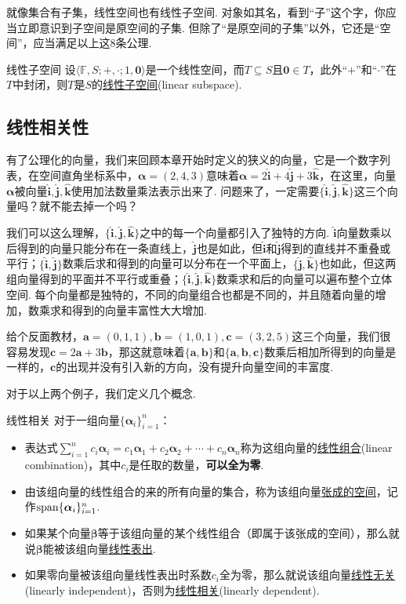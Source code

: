 \documentclass[main.tex]{subfiles}
\begin{document}
就像集合有子集，线性空间也有线性子空间. 对象如其名，看到“子”这个字，你应当立即意识到子空间是原空间的子集. 但除了“是原空间的子集”以外，它还是“空间”，应当满足以上这8条公理.

\begin{definition}{线性子空间}
    设\(\langle \mathbb{F}, S;+,\cdot;1,\bm 0\rangle\)是一个线性空间，而\(T \subseteq S\)且\(\bm 0 \in T\)，此外“\(+\)”和“\(\cdot\)”在\(T\)中封闭，则\(T\)是\(S\)的\uline{线性子空间}(linear subspace).
\end{definition}

\subsection{线性相关性}

有了公理化的向量，我们来回顾本章开始时定义的狭义的向量，它是一个数字列表，在空间直角坐标系中，\(\bm\alpha = (2,4,3)\)意味着\(\bm{\alpha} = 2\bm{\hat i} + 4\bm{\hat j} + 3\bm{\hat k}\)，在这里，向量\(\bm\alpha\)被向量\(\bm{\hat i}, \bm{\hat j}, \bm{\hat k}\)使用加法数量乘法表示出来了. 问题来了，一定需要\(\{\bm{\hat i}, \bm{\hat j}, \bm{\hat k}\}\)这三个向量吗？就不能去掉一个吗？

我们可以这么理解，\(\{\bm{\hat i}, \bm{\hat j}, \bm{\hat k}\}\)之中的每一个向量都引入了独特的方向. \(\bm{\hat i}\)向量数乘以后得到的向量只能分布在一条直线上，\(\bm{\hat j}\)也是如此，但\(\bm{\hat i}\)和\(\bm{\hat j}\)得到的直线并不重叠或平行；\(\{\bm{\hat i},\bm{\hat j}\}\)数乘后求和得到的向量可以分布在一个平面上，\(\{\bm{\hat j},\bm{\hat k}\}\)也如此，但这两组向量得到的平面并不平行或重叠；\(\{\bm{\hat i}, \bm{\hat j}, \bm{\hat k}\}\)数乘求和后的向量可以遍布整个立体空间. 每个向量都是独特的，不同的向量组合也都是不同的，并且随着向量的增加，数乘求和得到的向量丰富性大大增加.

给个反面教材，\(\bm{a} = (0,1,1), \bm{b} = (1,0,1), \bm{c} = (3,2,5)\)这三个向量，我们很容易发现\(\bm{c} = 2\bm a+3\bm b\)，那这就意味着\(\{\bm a,\bm b\}\)和\(\{\bm a,\bm b,\bm c\}\)数乘后相加所得到的向量是一样的，\(\bm c\)的出现并没有引入新的方向，没有提升向量空间的丰富度.

对于以上两个例子，我们定义几个概念.

\begin{definition}{线性相关}
    对于一组向量\(\{\bm\alpha_i\}_{i=1}^{n}\)：
    \begin{itemize}
        \item 表达式\(\displaystyle{\sum_{i=1}^{n}c_i\bm\alpha_i = c_1\bm\alpha_1+c_2\bm\alpha_2+\cdots+c_n\bm\alpha_n}\)称为这组向量的\uline{线性组合}(linear combination)，其中\(c_i\)是任取的数量，\textbf{可以全为零}.
        \item 由该组向量的线性组合的来的所有向量的集合，称为该组向量\uline{张成的空间}，记作\({\rm span}\{\bm\alpha_i\}_{i=1}^{n}\).
        \item 如果某个向量\(\bm\beta\)等于该组向量的某个线性组合（即属于该张成的空间），那么就说\(\bm\beta\)能被该组向量\uline{线性表出}.
        \item 如果零向量被该组向量线性表出时系数\(c_i\)全为零，那么就说该组向量\uline{线性无关}(linearly independent)，否则为\uline{线性相关}(linearly dependent).
    \end{itemize}
\end{definition}
\end{document}
